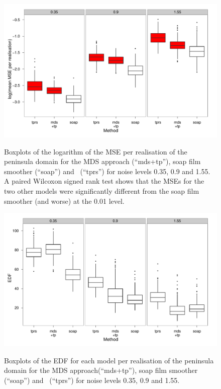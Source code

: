 \begin{figure}
\centering
\includegraphics[width=\textwidth]{mds/figs/mds-wt2-boxplot.pdf} \\
\caption{Boxplots of the logarithm of the MSE per realisation of the peninsula domain for the MDS approach (``mds+tp''), soap film smoother (``soap'') and \tprs\ (``tprs'') for noise levels 0.35, 0.9 and 1.55. A paired Wilcoxon signed rank test shows that the MSEs for the two other models were significantly different from the soap film smoother (and worse) at the 0.01 level.}
\label{mds-wt2-boxplot}
\end{figure}

\begin{figure}
\centering
\includegraphics[width=\textwidth]{mds/figs/mds-wt2-boxplot-edf.pdf} \\
\caption{Boxplots of the EDF for each model per realisation of the peninsula domain for the MDS approach(``mds+tp''), soap film smoother (``soap'') and \tprs\ (``tprs'') for noise levels 0.35, 0.9 and 1.55.}
\label{mds-wt2-boxplot-edf}
\end{figure}


